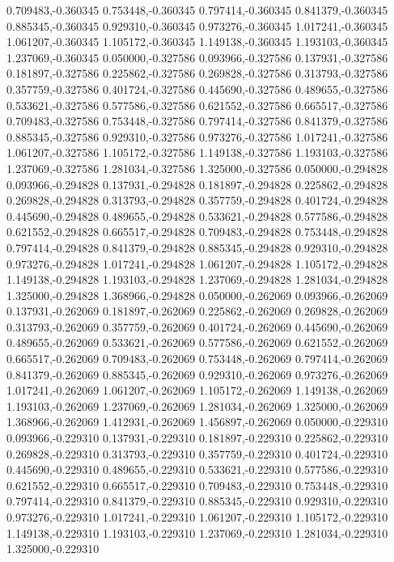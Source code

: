 0.709483,-0.360345
0.753448,-0.360345
0.797414,-0.360345
0.841379,-0.360345
0.885345,-0.360345
0.929310,-0.360345
0.973276,-0.360345
1.017241,-0.360345
1.061207,-0.360345
1.105172,-0.360345
1.149138,-0.360345
1.193103,-0.360345
1.237069,-0.360345
0.050000,-0.327586
0.093966,-0.327586
0.137931,-0.327586
0.181897,-0.327586
0.225862,-0.327586
0.269828,-0.327586
0.313793,-0.327586
0.357759,-0.327586
0.401724,-0.327586
0.445690,-0.327586
0.489655,-0.327586
0.533621,-0.327586
0.577586,-0.327586
0.621552,-0.327586
0.665517,-0.327586
0.709483,-0.327586
0.753448,-0.327586
0.797414,-0.327586
0.841379,-0.327586
0.885345,-0.327586
0.929310,-0.327586
0.973276,-0.327586
1.017241,-0.327586
1.061207,-0.327586
1.105172,-0.327586
1.149138,-0.327586
1.193103,-0.327586
1.237069,-0.327586
1.281034,-0.327586
1.325000,-0.327586
0.050000,-0.294828
0.093966,-0.294828
0.137931,-0.294828
0.181897,-0.294828
0.225862,-0.294828
0.269828,-0.294828
0.313793,-0.294828
0.357759,-0.294828
0.401724,-0.294828
0.445690,-0.294828
0.489655,-0.294828
0.533621,-0.294828
0.577586,-0.294828
0.621552,-0.294828
0.665517,-0.294828
0.709483,-0.294828
0.753448,-0.294828
0.797414,-0.294828
0.841379,-0.294828
0.885345,-0.294828
0.929310,-0.294828
0.973276,-0.294828
1.017241,-0.294828
1.061207,-0.294828
1.105172,-0.294828
1.149138,-0.294828
1.193103,-0.294828
1.237069,-0.294828
1.281034,-0.294828
1.325000,-0.294828
1.368966,-0.294828
0.050000,-0.262069
0.093966,-0.262069
0.137931,-0.262069
0.181897,-0.262069
0.225862,-0.262069
0.269828,-0.262069
0.313793,-0.262069
0.357759,-0.262069
0.401724,-0.262069
0.445690,-0.262069
0.489655,-0.262069
0.533621,-0.262069
0.577586,-0.262069
0.621552,-0.262069
0.665517,-0.262069
0.709483,-0.262069
0.753448,-0.262069
0.797414,-0.262069
0.841379,-0.262069
0.885345,-0.262069
0.929310,-0.262069
0.973276,-0.262069
1.017241,-0.262069
1.061207,-0.262069
1.105172,-0.262069
1.149138,-0.262069
1.193103,-0.262069
1.237069,-0.262069
1.281034,-0.262069
1.325000,-0.262069
1.368966,-0.262069
1.412931,-0.262069
1.456897,-0.262069
0.050000,-0.229310
0.093966,-0.229310
0.137931,-0.229310
0.181897,-0.229310
0.225862,-0.229310
0.269828,-0.229310
0.313793,-0.229310
0.357759,-0.229310
0.401724,-0.229310
0.445690,-0.229310
0.489655,-0.229310
0.533621,-0.229310
0.577586,-0.229310
0.621552,-0.229310
0.665517,-0.229310
0.709483,-0.229310
0.753448,-0.229310
0.797414,-0.229310
0.841379,-0.229310
0.885345,-0.229310
0.929310,-0.229310
0.973276,-0.229310
1.017241,-0.229310
1.061207,-0.229310
1.105172,-0.229310
1.149138,-0.229310
1.193103,-0.229310
1.237069,-0.229310
1.281034,-0.229310
1.325000,-0.229310
